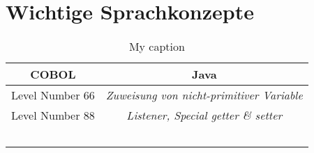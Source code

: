 \section{Wichtige Sprachkonzepte}

\begin{table}[H]
\centering
\begin{tabularx}{\textwidth}{|C|C|}
\hline
\textbf{\Large{COBOL}} & \textbf{\Large{Java}} \\\hline
Level Number 66 & \textit{Zuweisung von nicht-primitiver Variable} \\\hline
Level Number 88 & \textit{Listener, Special getter \& setter} \\\hline
& \\\hline
& \\\hline
& \\\hline
& \\\hline
& \\\hline
\end{tabularx}
\caption{My caption}
\label{my-label}
\end{table}